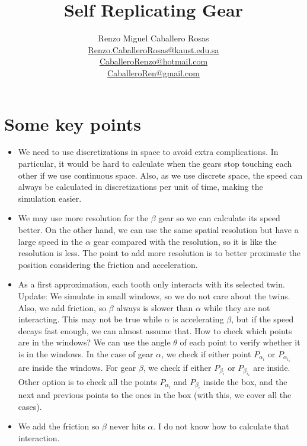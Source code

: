 \documentclass[12pt]{article}
\theoremstyle{definition}
\theoremstyle{remark}
\begin{document}
\title{Self Replicating Gear}
\author{Renzo Miguel Caballero Rosas\\
\url{Renzo.CaballeroRosas@kaust.edu.sa}\\
\url{CaballeroRenzo@hotmail.com}\\
\url{CaballeroRen@gmail.com}} 
\maketitle

\tableofcontents

\section{Some key points}

\begin{itemize}

\item We need to use discretizations in space to avoid extra complications. In particular, it would be hard to calculate when the gears stop touching each other if we use continuous space. Also, as we use discrete space, the speed can always be calculated in discretizations per unit of time, making the simulation easier.

\item We may use more resolution for the $\beta$ gear so we can calculate its speed better. On the other hand, we can use the same spatial resolution but have a large speed in the $\alpha$ gear compared with the resolution, so it is like the resolution is less. The point to add more resolution is to better proximate the position considering the friction and acceleration.

\item As a first approximation, each tooth only interacts with its selected twin. {\color{red} Update:} We simulate in small windows, so we do not care about the twins. Also, we add friction, so $\beta$ always is slower than $\alpha$ while they are not interacting. This may not be true while $\alpha$ is accelerating $\beta$, but if the speed decays fast enough, we can almost assume that. How to check which points are in the windows? We can use the angle $\theta$ of each point to verify whether it is in the windows. In the case of gear $\alpha$, we check if either point $P_{\alpha_i}$ or $P_{\alpha_{i_1}}$ are inside the windows. For gear $\beta$, we check if either $P_{\beta_i}$ or $P_{\beta_{i_4}}$ are inside. Other option is to check all the points $P_{\alpha_i}$ and $P_{\beta_i}$ inside the box, and the next and previous points to the ones in the box (with this, we cover all the cases).

\item We add the friction so $\beta$ never hits $\alpha$. I do not know how to calculate that interaction.

\end{itemize}
\end{document}

